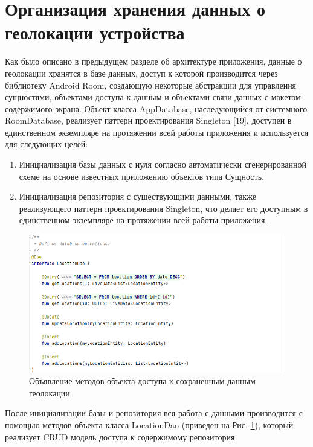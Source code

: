 \section{Организация хранения данных о геолокации устройства}
Как было описано в предыдущем разделе об архитектуре приложения, данные о геолокации хранятся в базе данных, доступ к которой производится через библиотеку Android Room, создающую некоторые абстракции для управления сущностями, объектами доступа к данным и объектами связи данных с макетом содержимого экрана.
Объект класса AppDatabase, наследующийся от системного RoomDatabase, реализует паттерн проектирования Singleton [19], доступен в единственном экземпляре на протяжении всей работы приложения и используется для следующих целей:
\begin{enumerate}
	\item Инициализация базы данных с нуля согласно автоматически сгенерированной схеме на основе известных приложению объектов типа Сущность.
	\item Инициализация репозитория с существующими данными, также реализующего паттерн проектирования Singleton, что делает его доступным в единственном экземпляре на протяжении всей работы приложения.
\end{enumerate}


\begin{figure}
	\centering
	\includegraphics[width=\textwidth]{flesh/somefunc/location_dao.png}
	\caption{\label{fig:location_dao}Объявление методов объекта доступа к сохраненным данным геолокации}
\end{figure}

После инициализации базы и репозитория вся работа с данными производится с помощью методов объекта класса LocationDao (приведен на Рис. \ref{fig:location_dao}), который реализует CRUD модель доступа к содержимому репозитория.

